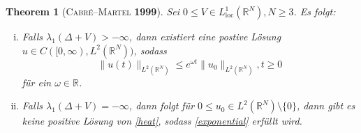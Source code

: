 \documentclass[11pt]{article}
\newtheorem{thm}{Theorem}
\theoremstyle{break}
\begin{document}
\begin{thm}[\textsc{Cabr\'e--Martel} \textbf{1999}]\label{martel}
Sei $0\le V\in L^1_{\text{loc}}(\mathbb R^N), N\ge 3$.  Es folgt:
\begin{enumerate}[(i)]
\item Falls $\lambda_1(\Delta + V) > -\infty$, dann existiert eine postive L\"osung $u\in C([0,\infty), L^2(\mathbb R^N))$, sodass
\begin{equation}\label{exponential}
\|u(t)\|_{L^2(\mathbb R^N)} \le e^{\omega t} \|u_0\|_{L^2(\mathbb R^N)}, t\ge 0
\end{equation}
f\"ur ein $\omega\in \mathbb R$.
\item Falls $\lambda_1(\Delta + V)=-\infty$, dann folgt f\"ur $0\le u_0 \in L^2(\mathbb R^N)\setminus\{0\}$, dann gibt es keine positive L\"osung von \eqref{heat}, sodass \eqref{exponential} erfüllt wird.
\end{enumerate}
\end{thm}
\end{document}
